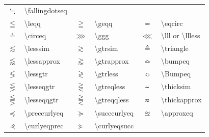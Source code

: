 \documentclass[a4paper]{ctexart}
\begin{document}
\begin{table}[H]
\begin{tabular}{clclcl}
            $\fallingdotseq$        & \textbackslash fallingdotseq                                                          \\
            $\leqq$                 & \textbackslash leqq               & $\geqq$           & \textbackslash geqq           &
            $\eqcirc$               & \textbackslash eqcirc                                                                 \\
            $\circeq$               & \textbackslash circeq             & $\ggg$            & \textbackslash ggg            &
            $\lll$                  & \textbackslash lll or \textbackslash llless                                           \\
            $\lesssim$              & \textbackslash lesssim            & $\gtrsim$         & \textbackslash gtrsim         &
            $\triangleq$            & \textbackslash triangle                                                               \\
            $\lessapprox$           & \textbackslash lessapprox         & $\gtrapprox$      & \textbackslash gtrapprox      &
            $\bumpeq$               & \textbackslash bumpeq                                                                 \\
            $\lessgtr$              & \textbackslash lessgtr            & $\gtrless$        & \textbackslash gtrless        &
            $\Bumpeq$               & \textbackslash Bumpeq                                                                 \\
            $\lesseqgtr$            & \textbackslash lesseqgtr          & $\gtreqless$      & \textbackslash gtreqless      &
            $\thicksim$             & \textbackslash thicksim                                                               \\
            $\lesseqqgtr$           & \textbackslash lesseqqgtr         & $\gtreqqless$     & \textbackslash gtreqqless     &
            $\thickapprox$          & \textbackslash thickapprox                                                            \\
            $\preccurlyeq$          & \textbackslash preccurlyeq        & $\succcurlyeq$    & \textbackslash succcurlyeq    &
            $\approxeq$             & \textbackslash approxeq                                                               \\
            $\curlyeqprec$          & \textbackslash curlyeqprec        & $\curlyeqsucc$    & \textbackslash curlyeqsucc    &

\end{tabular}
\end{table}
\end{document}
